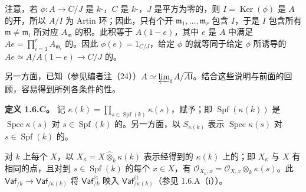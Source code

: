 注意，若 $\phi:A\to C/J$ 是 $k$-，$C$ 是 $k$-，$J$ 是平方为零的，则 $I=\operatorname{Ker}(\phi)$ 是 $A$ 的开，所以 $A/I$ 为 Artin 环；因此，只有个开 $\mathfrak m_1,\ldots,\mathfrak m_r$ 包含 $I$，于是 $I$ 包含所有 $\mathfrak m\ne\mathfrak m_i$ 所对应 $A_{\mathfrak m}$ 的积。此积等于 $A(1-e)$，其中 $e$ 是 $A$ 中满足 $Ae=\prod_{i=1}^rA_{\mathfrak m_i}$ 的。因此 $\phi(e)=1_{C/J}$，给定 $\phi$ 的就等同于给定 $\phi$ 所诱导的 $Ae\simeq A/A(1-e)\to C/J$ 的。

另一方面，已知（参见编者注（24））$A\simeq\varprojlim_{\mathfrak l}A/\overline{A\mathfrak l}$。结合这些说明与前面的回顾，容易得到所列各条件的性。

\textbf{定义 1.6.C。} 记 $\kappa(k)=\prod_{s\in\operatorname{Spf}(k)}\kappa(s)$，赋予；即 $\operatorname{Spf}(\kappa(k))$ 是 $\operatorname{Spec}\kappa(s)$ 对 $s\in\operatorname{Spf}(k)$ 的。另一方面，以 $S_{\kappa(k)}$ 表示 $\operatorname{Spec}\kappa(s)$ 对 $s\in\operatorname{Spf}(k)$ 的。

对 $k$ 上每个 $X$，以 $X_\kappa=X\widehat\otimes_k\kappa(k)$ 表示经得到的 $\kappa(k)$ 上的；即 $X_\kappa$ 与 $X$ 有相同的点，且对到 $s\in\operatorname{Spf}(k)$ 的每个 $x\in X$，有 $\mathcal O_{X_\kappa,x}=\mathcal O_{X,x}\otimes_k\kappa(s)$。此 $\mathsf{Vaf}_{/k}\to\mathsf{Vaf}_{/\kappa(k)}$ 将 $\mathsf{Vaf}^{\text{ét}}_{/k}$ 映入 $\mathsf{Vaf}^{\text{ét}}_{/\kappa(k)}$（参见 1.6.A（i））。

